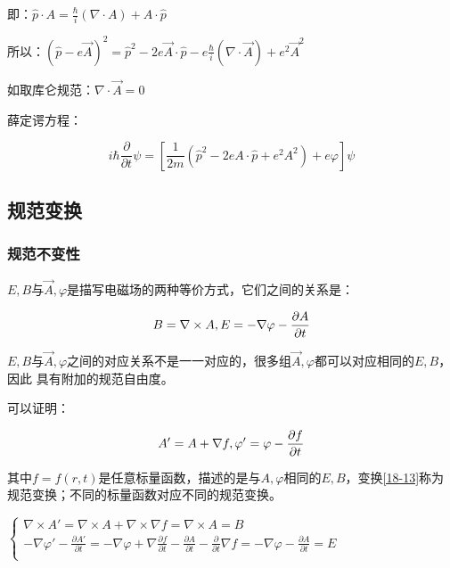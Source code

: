 即：$\widehat p \cdot A = \frac{\hbar }{i}\left( {\nabla  \cdot A} \right) + A \cdot \widehat p$

所以：$\left( {\widehat p - e\vec A} \right)^2  = \widehat p^2  - 2e\vec A \cdot \widehat p - e\frac{\hbar }{i}\left( {\nabla  \cdot \vec A} \right) + e^2 \vec A^2 $

如取库仑规范：$\nabla  \cdot \vec A = 0$

薛定谔方程：

\begin{equation}\label{18-11}
i\hbar \frac{\partial }{{\partial t}}\psi  = \left[ {\frac{1}{{2m}}\left( {\widehat p
^2  - 2eA \cdot \widehat p + e^2 A^2 } \right) + e\varphi } \right]\psi
\end{equation}



\subsection{规范变换}

\subsubsection{规范不变性}


$E, B$与$\vec A, \varphi$是描写电磁场的两种等价方式，它们之间的关系是：

\begin{equation}\label{18-12}
B = \nabla  \times A, \\
E =  - \nabla \varphi  - \frac{{\partial A}}{{\partial t}}
\end{equation}

$E, B$与$\vec A, \varphi$之间的对应关系不是一一对应的，很多组$\vec A, \varphi$都可以对应相同的$E, B$，因此 具有附加的规范自由度。

可以证明：

\begin{equation}\label{18-13}
A' = A + \nabla f , \\
\varphi ' = \varphi  - \frac{{\partial f}}{{\partial t}}
\end{equation}

其中$f = f\left( {r,t} \right)$是任意标量函数，描述的是与$A,\varphi $相同的$E,B$，变换\ref{18-13}称为规范变换；不同的标量函数对应不同的规范变换。

\begin{center}
$\left\{ \begin{array}{l}
 \nabla  \times A' = \nabla  \times A + \nabla  \times \nabla f = \nabla  \times A = B \\
  - \nabla \varphi ' - \frac{{\partial A'}}{{\partial t}} =  - \nabla \varphi  + \nabla \frac{{\partial f}}{{\partial t}} - \frac{{\partial A}}{{\partial t}} - \frac{\partial }{{\partial t}}\nabla f =  - \nabla \varphi  - \frac{{\partial A}}{{\partial t}} = E \\
 \end{array} \right.$
\end{center}

